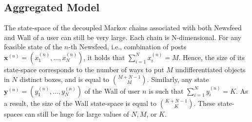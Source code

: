 \documentclass[10pt, conference, letterpaper]{IEEEtran}
\begin{document}
%
%
%

\subsection{Aggregated Model}
\label{AggMod}

The state-space of the decoupled Markov chains associated with both Newsfeed and Wall of a user can still be very large. Each chain is N-dimensional. For any feasible state of the $n$-th Newsfeed, i.e., combination of posts $\mathbf{x}^{(n)}=(x_1^{(n)},\ldots,x_N^{(n)})$, it holds that $\sum_{i=1}^N x^{(n)}_i=M$. Hence, the size of its state-space corresponds to the number of ways to put $M$ undifferentiated objects in $N$ distinct boxes, and is equal to $\binom{M+N-1}{M}$.
Similarly, any state $\mathbf{y}^{(n)}=(y_1^{(n)},\ldots,y_N^{(n)})$ of the Wall of user $n$  is such that $\sum_{i=1}^N y^{(n)}_i=K$. As a result, the size of the Wall state-space is equal to $\binom{K+N-1}{K}$. These state-spaces can still be huge for large values of $N,M$, or $K$.
\end{document}
